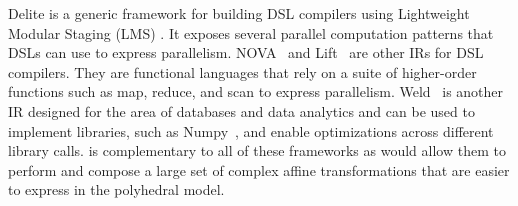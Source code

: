 Delite \cite{chafi_domain-specific_2011} is a generic
framework for building DSL compilers using Lightweight Modular Staging (LMS) \cite{lms_staging_10}. It exposes several parallel computation patterns that DSLs can use to express parallelism.
NOVA~\cite{Collins:2014:NFL:2627373.2627375} and Lift~\cite{Steuwer:2017:LFD:3049832.3049841} are other IRs for DSL compilers.  They are functional languages that rely on a suite of higher-order functions such as map, reduce, and scan to express parallelism.
Weld~\cite{palkar2017weld} is another IR designed for the area of databases and data analytics and can be used to implement libraries, such as Numpy~\cite{numpy}, and enable optimizations across different library calls.
\framework{} is complementary to all of these frameworks as \framework{} would allow them to perform and compose a large set of complex affine transformations that are easier to express in the polyhedral model.

